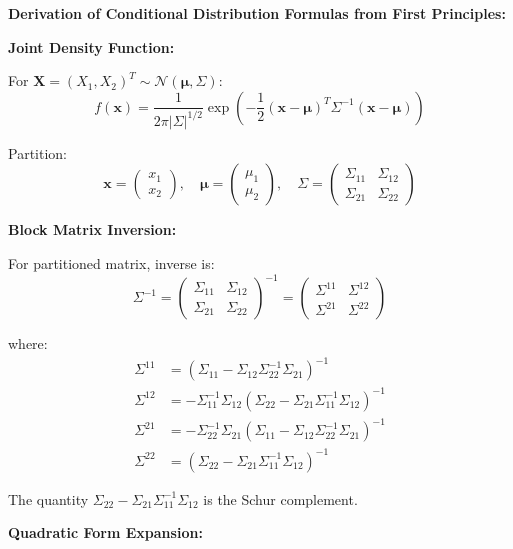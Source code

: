 \documentclass[12pt]{article}
\begin{document}
\begin{explanation}

\textbf{Derivation of Conditional Distribution Formulas from First Principles:}

\textbf{Joint Density Function:}

For $\mathbf{X} = (X_1, X_2)^T \sim \mathcal{N}(\boldsymbol{\mu}, \Sigma)$:
\[
f(\mathbf{x}) = \frac{1}{2\pi|\Sigma|^{1/2}}\exp\left(-\frac{1}{2}(\mathbf{x} - \boldsymbol{\mu})^T\Sigma^{-1}(\mathbf{x} - \boldsymbol{\mu})\right)
\]

Partition:
\[
\mathbf{x} = \begin{pmatrix} x_1 \\ x_2 \end{pmatrix}, \quad \boldsymbol{\mu} = \begin{pmatrix} \mu_1 \\ \mu_2 \end{pmatrix}, \quad \Sigma = \begin{pmatrix} \Sigma_{11} & \Sigma_{12} \\ \Sigma_{21} & \Sigma_{22} \end{pmatrix}
\]

\textbf{Block Matrix Inversion:}

For partitioned matrix, inverse is:
\[
\Sigma^{-1} = \begin{pmatrix} \Sigma_{11} & \Sigma_{12} \\ \Sigma_{21} & \Sigma_{22} \end{pmatrix}^{-1} = \begin{pmatrix} \Sigma^{11} & \Sigma^{12} \\ \Sigma^{21} & \Sigma^{22} \end{pmatrix}
\]

where:
\begin{align*}
\Sigma^{11} &= (\Sigma_{11} - \Sigma_{12}\Sigma_{22}^{-1}\Sigma_{21})^{-1} \\
\Sigma^{12} &= -\Sigma_{11}^{-1}\Sigma_{12}(\Sigma_{22} - \Sigma_{21}\Sigma_{11}^{-1}\Sigma_{12})^{-1} \\
\Sigma^{21} &= -\Sigma_{22}^{-1}\Sigma_{21}(\Sigma_{11} - \Sigma_{12}\Sigma_{22}^{-1}\Sigma_{21})^{-1} \\
\Sigma^{22} &= (\Sigma_{22} - \Sigma_{21}\Sigma_{11}^{-1}\Sigma_{12})^{-1}
\end{align*}

The quantity $\Sigma_{22} - \Sigma_{21}\Sigma_{11}^{-1}\Sigma_{12}$ is the Schur complement.

\textbf{Quadratic Form Expansion:}


\end{explanation}
\end{document}
